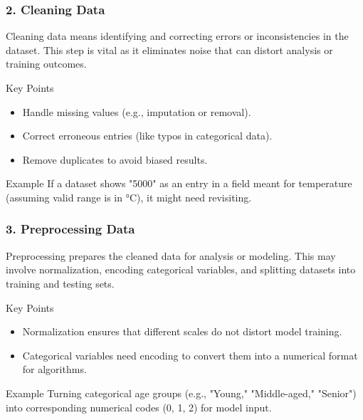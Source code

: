\documentclass[aspectratio=169]{beamer}
\begin{document}
\begin{frame}[fragile]
    \frametitle{2. Cleaning Data}
    Cleaning data means identifying and correcting errors or inconsistencies in the dataset. This step is vital as it eliminates noise that can distort analysis or training outcomes.

    \begin{block}{Key Points}
        \begin{itemize}
            \item Handle missing values (e.g., imputation or removal).
            \item Correct erroneous entries (like typos in categorical data).
            \item Remove duplicates to avoid biased results.
        \end{itemize}
    \end{block}
    
    \begin{block}{Example}
        If a dataset shows "5000" as an entry in a field meant for temperature (assuming valid range is in °C), it might need revisiting.
    \end{block}
\end{frame}

\begin{frame}[fragile]
    \frametitle{3. Preprocessing Data}
    Preprocessing prepares the cleaned data for analysis or modeling. This may involve normalization, encoding categorical variables, and splitting datasets into training and testing sets.

    \begin{block}{Key Points}
        \begin{itemize}
            \item Normalization ensures that different scales do not distort model training.
            \item Categorical variables need encoding to convert them into a numerical format for algorithms.
        \end{itemize}
    \end{block}
    
    \begin{block}{Example}
        Turning categorical age groups (e.g., "Young," "Middle-aged," "Senior") into corresponding numerical codes (0, 1, 2) for model input.
    \end{block}
\end{frame}
\end{document}
